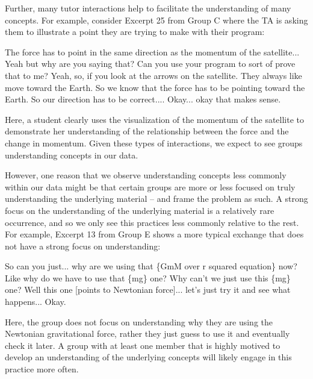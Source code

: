 \documentclass{msuphddissertation}
\begin{document}
\begin{doublespace}
Further, many tutor interactions help to facilitate the understanding of many concepts.  For example, consider Excerpt 25 from Group C where the TA is asking them to illustrate a point they are trying to make with their program: \begin{description}
\SA The force has to point in the same direction as the momentum of the satellite...
\TA Yeah but why are you saying that?
\TA Can you use your program to sort of prove that to me?
\SA Yeah, so, if you look at the arrows on the satellite.
\SA They always like move toward the Earth.
\SA So we know that the force has to be pointing toward the Earth.
\SA So our direction has to be correct....
\TA Okay... okay that makes sense.
\end{description}  Here, a student clearly uses the visualization of the momentum of the satellite to demonstrate her understanding of the relationship between the force and the change in momentum.  Given these types of interactions, we expect to see groups understanding concepts in our data.

However, one reason that we observe understanding concepts less commonly within our data might be that certain groups are more or less focused on truly understanding the underlying material -- and frame the problem as such.  A strong focus on the understanding of the underlying material is a relatively rare occurrence, and so we only see this practices less commonly relative to the rest.  For example, Excerpt 13 from Group E shows a more typical exchange that does not have a strong focus on understanding: \begin{description}
\SD So can you just... why are we using that \{GmM over r squared equation\} now?
\SD Like why do we have to use that \{mg\} one?
\SB Why can't we just use this \{mg\} one?
\SC Well this one [points to Newtonian force]... let's just try it and see what happens...
\SD Okay.
\end{description}  Here, the group does not focus on understanding why they are using the Newtonian gravitational force, rather they just guess to use it and eventually check it later.  A group with at least one member that is highly motived to develop an understanding of the underlying concepts will likely engage in this practice more often.  %

%
%
%


\end{doublespace}
\end{document}
